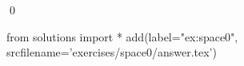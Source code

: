 
\begin{ex} 
  \label{ex:space0}
  
  \qed
\end{ex} 
\begin{python0}
from solutions import *
add(label="ex:space0",
    srcfilename='exercises/space0/answer.tex') 
\end{python0}
